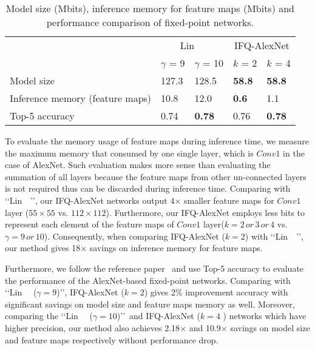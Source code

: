 \documentclass[10pt,twocolumn,letterpaper]{article}
\begin{document}
\begin{table} [!h]
\centering
\caption{Model size (Mbits), inference memory for feature maps (Mbits)  and performance comparison of fixed-point networks.}\label{tab:perfcompare}
\setlength{\tabcolsep}{2pt}
\begin{tabular}{p{2.6cm}<{\centering}|p{1.0cm}<{\centering}|p{1.2cm}<{\centering}|p{1.0cm}<{\centering}|p{1.0cm}<{\centering}}
		\hline                   & \multicolumn{2}{c|}{Lin~\etal~\cite{LinFixPoint}} &\multicolumn{2}{c}{IFQ-AlexNet}\\
		\cline{2-5}              & $\gamma$ = 9  & $\gamma$ = 10 &$k$ = 2  & $k$ = 4 \\
		\hline\hline  {Model size}   &127.3     &128.5     & \textbf{58.8}     &\textbf{58.8}  \\
		\hline {Inference memory (feature maps) }  &10.8   &12.0 & \textbf{0.6}     &1.1  \\
		\hline {Top-5 accuracy}   &0.74  &\textbf{0.78} & 0.76     &\textbf{0.78} \\
\hline
	\end{tabular}
\end{table}

To evaluate the memory usage of feature maps during inference time, we measure the maximum memory that consumed by one single layer, which is $Conv1$ in the case of AlexNet. Such evaluation makes more sense than evaluating the summation of all layers because the feature maps from other un-connected layers is not required thus can be discarded during inference time. Comparing with \lq\lq Lin~\etal~\cite{LinFixPoint}\rq\rq, our IFQ-AlexNet networks output 4$\times$ smaller feature maps for $Conv1$ layer  ($55\times 55$ vs. $112\times 112$). Furthermore, our IFQ-AlexNet employs less bits to represent each element of the feature maps of $Conv1$ layer($k=2\, or \,3\, or\, 4$ vs. $\gamma=9\, or\, 10$). Consequently, when comparing IFQ-AlexNet ($k=2$) with \lq\lq Lin~\etal~\cite{LinFixPoint}\rq\rq, our method gives 18$\times$ savings on inference memory for feature maps.

Furthermore, we follow the reference paper~\cite{LinFixPoint} and use Top-5 accuracy to evaluate the performance of the AlexNet-based fixed-point networks. Comparing with \lq\lq Lin~\etal~\cite{LinFixPoint} ($\gamma=9$)\rq\rq, IFQ-AlexNet ($k=2$) gives 2\% improvement accuracy with significant savings on model size and feature maps memory as well. Moreover, comparing the \lq\lq Lin~\etal~\cite{LinFixPoint} ($\gamma=10$)\rq\rq\, and IFQ-AlexNet ($k=4$ ) networks which have higher precision, our method also achieves 2.18$\times$ and 10.9$\times$ savings on model size and feature maps respectively without performance drop.
\end{document}
